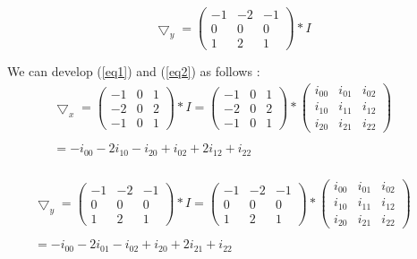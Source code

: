 \documentclass[12pt,a4paper]{article}
\begin{document}
\vspace{0.5cm}

\begin{equation}\label{eq2}
\bigtriangledown_y = \begin{pmatrix}
-1 & -2 & -1 \\ 
0 & 0 & 0 \\ 
1 & 2 & 1
\end{pmatrix}*I
\end{equation}

\vspace{0.5cm}

We can develop (\ref{eq1}) and (\ref{eq2}) as follows :\\

\begin{equation}\label{eq3}
\begin{matrix}
\bigtriangledown_x = \begin{pmatrix}
-1 & 0 & 1 \\ 
-2 & 0 & 2 \\ 
-1 & 0 & 1
\end{pmatrix}*I  = \begin{pmatrix}
-1 & 0 & 1 \\ 
-2 & 0 & 2 \\ 
-1 & 0 & 1
\end{pmatrix}* \begin{pmatrix}
i_{00} & i_{01} & i_{02} \\ 
i_{10} & i_{11} & i_{12}\\ 
i_{20} & i_{21} & i_{22}
\end{pmatrix}  \\ 
& & \\
 =  -i_{00}-2i_{10}-i_{20}+i_{02}+2i_{12}+i_{22} \\ 
\end{matrix}
\end{equation}

\vspace{1cm}

\begin{equation}\label{eq4}
\begin{matrix}
\bigtriangledown_y = \begin{pmatrix}
-1 & -2 & -1 \\ 
0 & 0 & 0 \\ 
1 & 2 & 1
\end{pmatrix}*I  = \begin{pmatrix}
-1 & -2 & -1 \\ 
0 & 0 & 0 \\ 
1 & 2 & 1
\end{pmatrix}* \begin{pmatrix}
i_{00} & i_{01} & i_{02} \\ 
i_{10} & i_{11} & i_{12}\\ 
i_{20} & i_{21} & i_{22}
\end{pmatrix}  \\ 
& & \\
 =  -i_{00}-2i_{01}-i_{02}+i_{20}+2i_{21}+i_{22} \\ 
\end{matrix}
\end{equation}
 
\end{document}
